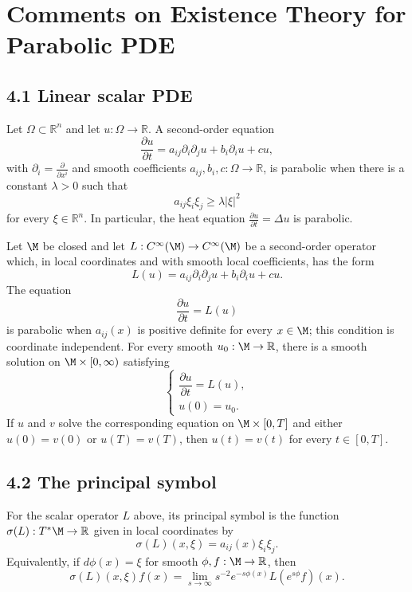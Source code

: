 \chapter{Comments on Existence Theory for Parabolic PDE}

\section*{4.1 \quad Linear scalar PDE}

Let $\Omega\subset\mathbb R^n$ and let $u:\Omega\to\mathbb R$. A second-order
equation
\[
\frac{\partial u}{\partial t}
 =a_{ij}\partial_i\partial_j u+b_i\partial_i u+cu,
\tag{4.1.1}
\]
with $\partial_i=\frac{\partial}{\partial x^i}$ and smooth coefficients
$a_{ij},b_i,c:\Omega\to\mathbb R$, is parabolic when there is a constant
$\lambda>0$ such that
\[
a_{ij}\xi_i\xi_j\geq\lambda\lvert\xi\rvert^2
\tag{4.1.2}
\]
for every $\xi\in\mathbb R^n$. In particular, the heat equation
$\frac{\partial u}{\partial t}=\Delta u$ is parabolic.

Let $\M$ be closed and let $L:C^\infty(\M)\to C^\infty(\M)$ be a second-order
operator which, in local coordinates and with smooth local coefficients, has the form
\[
L(u)=a_{ij}\partial_i\partial_j u+b_i\partial_i u+cu.
\]
The equation
\[
\frac{\partial u}{\partial t}=L(u)
\tag{4.1.3}
\]
is parabolic when $a_{ij}(x)$ is positive definite for every $x\in\M$; this
condition is coordinate independent. For every smooth $u_0:\M\to\mathbb R$,
there is a smooth solution on $\M\times[0,\infty)$ satisfying
\[
\begin{cases}
\dfrac{\partial u}{\partial t}=L(u),\\
u(0)=u_0.
\end{cases}
\]
If $u$ and $v$ solve the corresponding equation on $\M\times[0,T]$ and either
$u(0)=v(0)$ or $u(T)=v(T)$, then $u(t)=v(t)$ for every $t\in[0,T]$.

\section*{4.2 \quad The principal symbol}

\begin{definition}
\label{topping-pde-principal-symbol-scalar}
For the scalar operator $L$ above, its principal symbol is the function
$\sigma(L):T^*\M\to\mathbb R$ given in local coordinates by
\[
\sigma(L)(x,\xi)=a_{ij}(x)\xi_i\xi_j.
\]
Equivalently, if $d\phi(x)=\xi$ for smooth $\phi,f:\M\to\mathbb R$, then
\[
\sigma(L)(x,\xi)f(x)
 =\lim_{s\to\infty}s^{-2}e^{-s\phi(x)}L(e^{s\phi}f)(x).
\tag{4.2.2}
\]
\end{definition}

